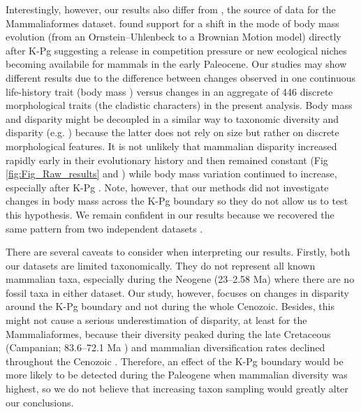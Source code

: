\documentclass[12pt,letterpaper]{article}
\begin{document}
Interestingly, however, our results also differ from \cite{Slater2012MEE}, the source of data for the Mammaliaformes dataset.
\cite{Slater2012MEE} found support for a shift in the mode of body mass evolution (from an Ornstein--Uhlenbeck to a Brownian Motion model) directly after K-Pg suggesting a release in competition pressure or new ecological niches becoming availabile for mammals in the early Paleocene.
Our studies may show different results due to the difference between changes observed in one continuous life-history trait (body mass \cite{Slater2012MEE}) versus changes in an aggregate of 446 discrete morphological traits (the cladistic characters) in the present analysis.
Body mass and disparity might be decoupled in a similar way to taxonomic diversity and disparity (e.g. \cite{slaterCetacean,ruta2013,hopkinsdecoupling2013}) because the latter does not rely on size but rather on discrete morphological features.
It is not unlikely that mammalian disparity increased rapidly early in their evolutionary history and then remained constant (Fig \ref{fig:Fig_Raw_results} and \cite{Close2015,Lee2015R759}) while body mass variation continued to increase, especially after K-Pg \cite{Slater2012MEE}.
Note, however, that our methods did not investigate changes in body mass across the K-Pg boundary so they do not allow us to test this hypothesis.
We remain confident in our results because we recovered the same pattern from two independent datasets \cite{Slater2012MEE,beckancient2014}.

There are several caveats to consider when interpreting our results. 
Firstly, both our datasets are limited taxonomically.
They do not represent all known mammalian taxa, especially during the Neogene (23--2.58 Ma) where there are no fossil taxa in either dataset.
Our study, however, focuses on changes in disparity around the K-Pg boundary and not during the whole Cenozoic.
Besides, this might not cause a serious underestimation of disparity, at least for the Mammaliaformes, because their diversity peaked during the late Cretaceous (Campanian; 83.6--72.1 Ma \cite{Newham201432}) and mammalian diversification rates declined throughout the Cenozoic \cite{Raia2012}.
Therefore, an effect of the K-Pg boundary would be more likely to be detected during the Paleogene when mammalian diversity was highest, so we do not believe that increasing taxon sampling would greatly alter our conclusions.
\end{document}
